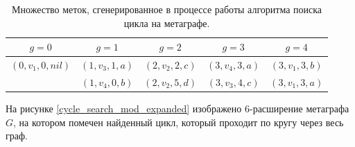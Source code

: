 \documentclass[14pt]{mmcs-article}
\begin{document}
\begin{table}[H]
    \centering
    \begin{tabular}{ | c | c | c | c | c | }
        \hline
        $g = 0$            & $g = 1$           & $g = 2$           & $g = 3$           & $g = 4$            \\ \hline
        $(0, v_1, 0, nil)$ & $(1, v_3,  1, a)$ & $(2, v_2,  2, c)$ & $(3, v_4,  3, a)$ & $(3, v_1,  3, b)$  \\ \hline
                           & $(1, v_4,  0, b)$ & $(2, v_2,  5, d)$ & $(3, v_3,  4, c)$ & $(3, v_1,  3, a)$  \\ \hline
    \end{tabular}
    \caption{ Множество меток, сгенерированное в процессе работы алгоритма поиска цикла на метаграфе. }
    \label{cycle_search_mod_table}
\end{table}

На рисунке \ref{cycle_search_mod_expanded} изображено 6-расширение метаграфа $G$, на котором помечен найденный цикл, который проходит по кругу через весь граф.
\end{document}
